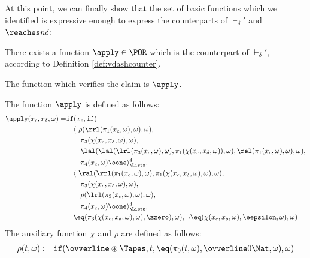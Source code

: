 \begin{conditional}{\notappendix}
    At this point, we can finally show that the set of basic functions which
    we identified is expressive enough to express the counterparts of
    $\vdash_\delta'$ and $\reaches n \delta$:

    \begin{lemma}[$\apply \in \POR$]
      \label{lemma:applyinPOR}
      There exists a function $\apply\in \POR$ which is the counterpart of
      $\vdash_\delta'$, according to Definition \ref{def:vdashcounter}.
    \end{lemma}

    The function which verifies the claim is $\apply$.

    \begin{defn}[$\apply$]
      The function $\apply$ is defined as follows:
      \begin{align*}
        \apply(x_c, x_\delta, \omega) = &\mathtt{if}(
        x_c,
        \mathtt{if}(\\
        &\quad\langle\ \rho(\rrl(\pi_1(x_c,\omega),\omega), \omega),\\
        &\quad \quad\pi_3(\chi(x_c, x_\delta, \omega),\omega),\\
        &\quad \quad\lal(\lal(\lrl(\pi_3(x_c,\omega), \omega),
        \pi_1(\chi(x_c, x_\delta, \omega)),
        \omega), \rel(\pi_1(x_c,\omega),\omega),\omega),\\
        &\quad \quad \pi_4(x_c,\omega)\oone
        \rangle^4_\Lists,\\
        &\quad\langle\ \ral(\rrl(\pi_1(x_c,\omega),\omega),
       \pi_1(\chi(x_c, x_\delta, \omega),\omega), \omega),\\
       &\quad\quad \pi_3(\chi(x_c, x_\delta, \omega),\omega),\\
       &\quad\quad \rho(\lrl(\pi_3(x_c,\omega),\omega), \omega),\\
       &\quad\quad \pi_4(x_c,\omega)\oone\rangle^4_\Lists,  \\
       &\quad\eq(\pi_3(\chi(x_c, x_\delta, \omega), \omega), \zzero), \omega),
       \lnot \eq(\chi(x_c, x_\delta, \omega),\eepsilon, \omega),\omega)
      \end{align*}
      The auxiliary function $\chi$ and $\rho$ are defined as follows:
      \begin{align*}
        \rho(t,\omega) &:= \mathtt{if}(\ovverline \circledast \Tapes,
        t, \eq(\pi_0(t, \omega), \ovverline 0 \Nat, \omega), \omega)\\

\end{align*}
\end{defn}
\end{conditional}
